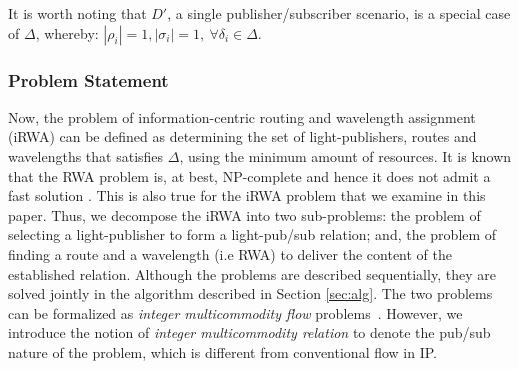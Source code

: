 \documentclass[journal]{IEEEtran}
\begin{document}
It is worth noting that $D'$, a single publisher/subscriber scenario, is a special case of $\Delta$, whereby: $|\rho_i| = 1, |\sigma_i|=1 , \ \forall \delta_i \in \Delta$.

\subsubsection{Problem Statement}
Now, the problem of information-centric routing and wavelength
assignment (iRWA) can be defined as determining the set of
light-publishers, routes and wavelengths that satisfies $\Delta$,
using the minimum amount of resources. It is known that the RWA
problem is, at best, NP-complete and hence it does not admit a fast
solution \cite{raj:alloptic,ste:rwa}. This is also true for the iRWA
problem that we examine in this paper. Thus, we decompose the iRWA
into two sub-problems: the problem of selecting a light-publisher to
form a light-pub/sub relation; and, the problem of finding a route
and a wavelength (i.e RWA) to deliver the content of the established relation. Although the problems are described
sequentially, they are solved jointly in the algorithm described in Section
\ref{sec:alg}. The two problems can be formalized as \emph{integer
 multicommodity flow} problems~\cite{ahu:netflow,raj:alloptic,
 ozd:rwa}. However, we introduce the notion of \emph{integer
 multicommodity relation} to denote the pub/sub nature of the
problem, which is different from conventional flow in IP.
\end{document}
